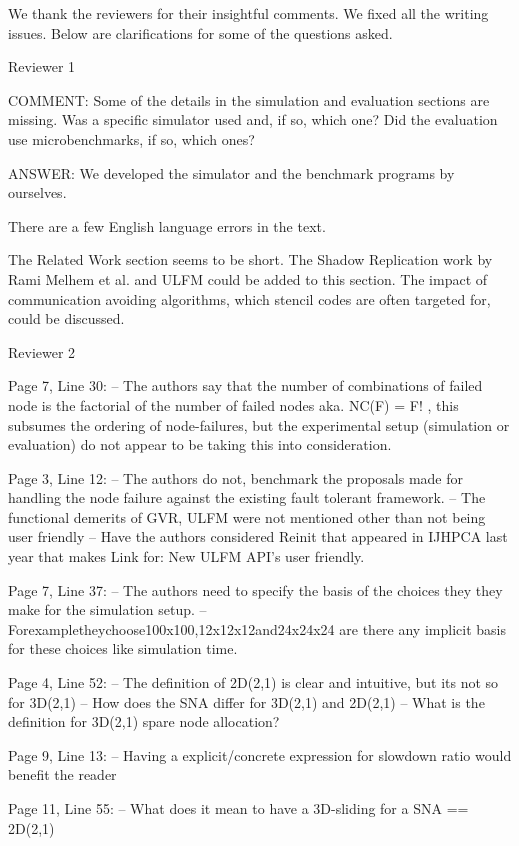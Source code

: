 \documentclass[]{letter}
\newcommand{\REVIEW}[2]{
\begin{description}
\item{COMMENT:}
#1%
\item{ANSWER:}
#2%
\end{description}
}
\begin{document}
We thank the reviewers for their insightful comments.  We fixed all
the writing issues. Below are clarifications for some of the questions
asked.

\begin{description}
\item{Reviewer 1}

\REVIEW{Some of the details in the simulation and evaluation sections are
missing. Was a specific simulator used and, if so, which one? Did the
evaluation use microbenchmarks, if so, which ones? }
{We developed the simulator and the benchmark programs by ourselves. }

There are a few English language errors in the text. 

The Related Work section seems to be short. 
The Shadow Replication work by Rami Melhem et al. and ULFM
could be added to this section. The impact of communication avoiding
algorithms, which stencil codes are often targeted for, could be
discussed. 

\item{Reviewer 2}

Page 7, Line 30:
– The authors say that the number of combinations of failed node is
the factorial of the number of failed nodes aka. NC(F) = F! , this
subsumes the ordering of node-failures, but the experimental setup
(simulation or evaluation) do not appear to be taking this into
consideration. 

Page 3, Line 12:
– The authors do not, benchmark the proposals made for handling the
node failure against the existing fault tolerant framework.
– The functional demerits of GVR, ULFM were not mentioned other than
not being user friendly 
– Have the authors considered Reinit that appeared in IJHPCA last year
that makes Link for: New ULFM API’s user friendly.

Page 7, Line 37:
– The authors need to specify the basis of the choices they they make
for the simulation setup. 
– Forexampletheychoose100x100,12x12x12and24x24x24 are there any
implicit basis for these choices like  simulation time.

Page 4, Line 52:
– The definition of 2D(2,1) is clear and intuitive, but its not so for 3D(2,1)
– How does the SNA differ for 3D(2,1) and 2D(2,1)
– What is the definition for 3D(2,1) spare node allocation?

Page 9, Line 13:
– Having a explicit/concrete expression for slowdown ratio would
benefit the reader 

Page 11, Line 55:
– What does it mean to have a 3D-sliding for a SNA == 2D(2,1)


\end{description}
\end{document}
